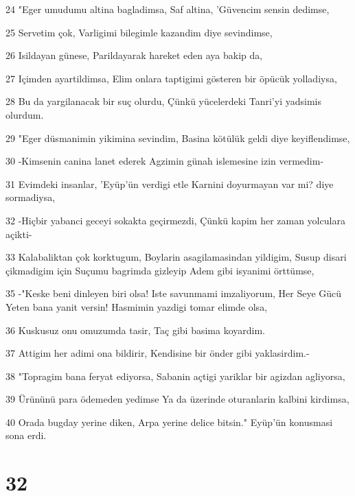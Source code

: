 \par 24 "Eger umudumu altina bagladimsa, Saf altina, 'Güvencim sensin dedimse,
\par 25 Servetim çok, Varligimi bilegimle kazandim diye sevindimse,
\par 26 Isildayan günese, Parildayarak hareket eden aya bakip da,
\par 27 Içimden ayartildimsa, Elim onlara taptigimi gösteren bir öpücük yolladiysa,
\par 28 Bu da yargilanacak bir suç olurdu, Çünkü yücelerdeki Tanri'yi yadsimis olurdum.
\par 29 "Eger düsmanimin yikimina sevindim, Basina kötülük geldi diye keyiflendimse,
\par 30 -Kimsenin canina lanet ederek Agzimin günah islemesine izin vermedim-
\par 31 Evimdeki insanlar, 'Eyüp'ün verdigi etle Karnini doyurmayan var mi? diye sormadiysa,
\par 32 -Hiçbir yabanci geceyi sokakta geçirmezdi, Çünkü kapim her zaman yolculara açikti-
\par 33 Kalabaliktan çok korktugum, Boylarin asagilamasindan yildigim, Susup disari çikmadigim için Suçumu bagrimda gizleyip Adem gibi isyanimi örttümse,
\par 35 -"Keske beni dinleyen biri olsa! Iste savunmami imzaliyorum, Her Seye Gücü Yeten bana yanit versin! Hasmimin yazdigi tomar elimde olsa,
\par 36 Kuskusuz onu omuzumda tasir, Taç gibi basima koyardim.
\par 37 Attigim her adimi ona bildirir, Kendisine bir önder gibi yaklasirdim.-
\par 38 "Topragim bana feryat ediyorsa, Sabanin açtigi yariklar bir agizdan agliyorsa,
\par 39 Ürününü para ödemeden yedimse Ya da üzerinde oturanlarin kalbini kirdimsa,
\par 40 Orada bugday yerine diken, Arpa yerine delice bitsin." Eyüp'ün konusmasi sona erdi.

\chapter{32}

